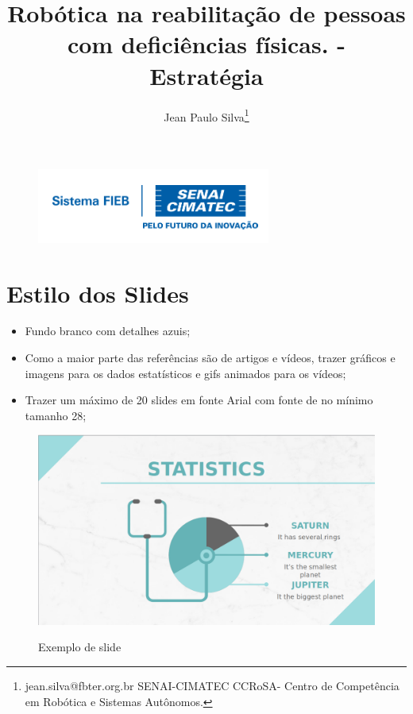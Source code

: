 \documentclass[12pt,a4paper]{article}
\begin{document}
 
\begin{figure}
    \flushright
    \includegraphics[scale=0.5]{Logo_senai.png}
\end{figure}

\title{Robótica na reabilitação de pessoas com deficiências físicas. - Estratégia}
\author{Jean Paulo Silva\thanks{jean.silva@fbter.org.br SENAI-CIMATEC  CCRoSA- Centro de Competência em Robótica e Sistemas Autônomos.}}
 
 

    \maketitle
    \singlespacing

    \section{Estilo dos Slides}
    \begin{itemize}
        \item Fundo branco com detalhes azuis;
        \item Como a maior parte das referências são de artigos e vídeos, trazer gráficos e imagens para os dados estatísticos e gifs animados para os vídeos;
        \item Trazer um máximo de 20 slides em fonte Arial com fonte de no mínimo tamanho 28;
    \end{itemize}
    \begin{figure}[ht]
        \caption{Exemplo de slide}
        \centering
        \includegraphics[width=1\linewidth]
        {images/exemplo.png}
        \label{fig:exemplo}
    \end{figure}
\end{document}

